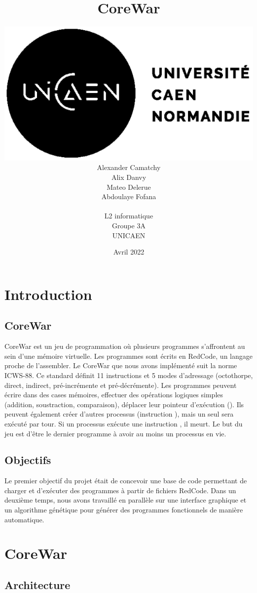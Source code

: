 \documentclass[a4paper,12pt]{article} %
\title{\vspace{\fill}CoreWar\vspace{\fill}}
\author{\includegraphics[scale=0.3]{images/unicaen.png} \\
		Alexander Camatchy\\Alix Danvy\\Mateo Delerue\\Abdoulaye Fofana\\\\
        L2 informatique\\
        Groupe 3A \\
        UNICAEN}
\date{Avril 2022}
\begin{document}
\maketitle

\newpage

\tableofcontents

\newpage
\section{Introduction}
\subsection{CoreWar}
CoreWar est un jeu de programmation où plusieurs programmes s'affrontent au sein d'une mémoire virtuelle. Les programmes sont écrits en RedCode, un langage proche de l'assembler. Le CoreWar que nous avons implémenté suit la norme ICWS-88. Ce standard définit 11 instructions et 5 modes d'adressage (octothorpe, direct, indirect, pré-incrémente et pré-décrémente). Les programmes peuvent écrire dans des cases mémoires, effectuer des opérations logiques simples (addition, soustraction, comparaison), déplacer leur pointeur d'exécution (). Ils peuvent également créer d'autres processus (instruction ), mais un seul sera exécuté par tour. Si un processus exécute une instruction , il meurt. Le but du jeu est d'être le dernier programme à avoir au moins un processus en vie.


\subsection{Objectifs}
Le premier objectif du projet était de concevoir une base de code permettant de charger et d'exécuter des programmes à partir de fichiers RedCode. Dans un deuxième temps, nous avons travaillé en parallèle sur une interface graphique et un algorithme génétique pour générer des programmes fonctionnels de manière automatique.

\section{CoreWar}
\subsection{Architecture}
\end{document}
